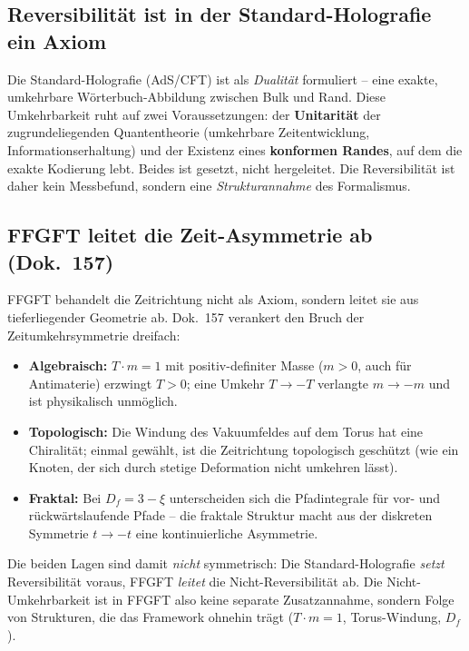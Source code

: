 \subsection*{Reversibilität ist in der Standard-Holografie ein Axiom}

Die Standard-Holografie (AdS/CFT) ist als \emph{Dualität} formuliert -- eine
exakte, umkehrbare Wörterbuch-Abbildung zwischen Bulk und Rand. Diese
Umkehrbarkeit ruht auf zwei Voraussetzungen: der \textbf{Unitarität} der
zugrundeliegenden Quantentheorie (umkehrbare Zeitentwicklung,
Informationserhaltung) und der Existenz eines \textbf{konformen Randes}, auf
dem die exakte Kodierung lebt. Beides ist gesetzt, nicht hergeleitet. Die
Reversibilität ist daher kein Messbefund, sondern eine \emph{Strukturannahme}
des Formalismus.

\subsection*{FFGFT leitet die Zeit-Asymmetrie ab (Dok.~157)}

FFGFT behandelt die Zeitrichtung nicht als Axiom, sondern leitet sie aus
tieferliegender Geometrie ab. Dok.~157 verankert den Bruch der
Zeitumkehrsymmetrie dreifach:

\begin{itemize}
  \item \textbf{Algebraisch:} $T \cdot m = 1$ mit positiv-definiter Masse
        ($m > 0$, auch für Antimaterie) erzwingt $T > 0$; eine Umkehr
        $T \to -T$ verlangte $m \to -m$ und ist physikalisch unmöglich.
  \item \textbf{Topologisch:} Die Windung des Vakuumfeldes auf dem Torus hat
        eine Chiralität; einmal gewählt, ist die Zeitrichtung topologisch
        geschützt (wie ein Knoten, der sich durch stetige Deformation nicht
        umkehren lässt).
  \item \textbf{Fraktal:} Bei $D_f = 3 - \xi$ unterscheiden sich die
        Pfadintegrale für vor- und rückwärtslaufende Pfade -- die fraktale
        Struktur macht aus der diskreten Symmetrie $t \to -t$ eine
        kontinuierliche Asymmetrie.
\end{itemize}

\noindent
Die beiden Lagen sind damit \emph{nicht} symmetrisch: Die Standard-Holografie
\emph{setzt} Reversibilität voraus, FFGFT \emph{leitet} die Nicht-Reversibilität
ab. Die Nicht-Umkehrbarkeit ist in FFGFT also keine separate Zusatzannahme,
sondern Folge von Strukturen, die das Framework ohnehin trägt
($T\cdot m=1$, Torus-Windung, $D_f$).

